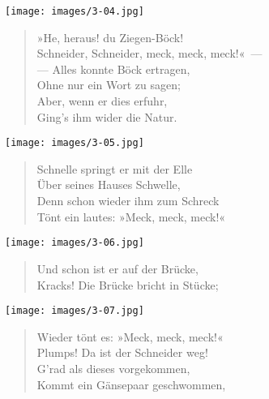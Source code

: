 \documentclass[a4paper,12pt]{article}
\begin{document}
\begin{center}\texttt{[image: images/3-04.jpg]}\end{center}



\begin{verse}
»He, heraus! du Ziegen-Böck!\\{}
Schneider, Schneider, meck, meck, meck!«~—\\{}
— Alles konnte Böck ertragen,\\{}
Ohne nur ein Wort zu sagen;\\{}
Aber, wenn er dies erfuhr,\\{}
Ging's ihm wider die Natur.
\end{verse}



\begin{center}\texttt{[image: images/3-05.jpg]}\end{center}



\begin{verse}
Schnelle springt er mit der Elle\\{}
Über seines Hauses Schwelle,\\{}
Denn schon wieder ihm zum Schreck\\{}
Tönt ein lautes: »Meck, meck, meck!«
\end{verse}



\begin{center}\texttt{[image: images/3-06.jpg]}\end{center}



\begin{verse}
Und schon ist er auf der Brücke,\\{}
Kracks! Die Brücke bricht in Stücke;
\end{verse}



\begin{center}\texttt{[image: images/3-07.jpg]}\end{center}



\begin{verse}
Wieder tönt es: »Meck, meck, meck!«\\{}
Plumps! Da ist der Schneider weg!\\{}
G'rad als dieses vorgekommen,\\{}
Kommt ein Gänsepaar geschwommen,
\end{verse}
\end{document}
